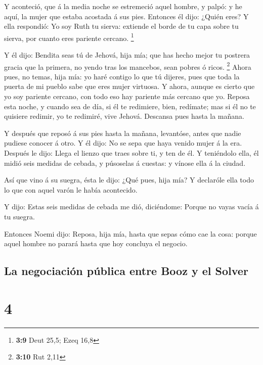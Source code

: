  Y aconteció, que á la media noche se estremeció aquel
hombre, y palpó: y he aquí, la mujer que estaba acostada á sus pies.
 Entonces él dijo: ¿Quién eres? Y ella respondió: Yo soy
Ruth tu sierva: extiende el borde de tu capa sobre tu sierva, por cuanto
eres pariente cercano. \footnote{\textbf{3:9} Deut 25,5; Ezeq 16,8}

 Y él dijo: Bendita seas tú de Jehová, hija mía; que has
hecho mejor tu postrera gracia que la primera, no yendo tras los
mancebos, sean pobres ó ricos. \footnote{\textbf{3:10} Rut 2,11}
 Ahora pues, no temas, hija mía: yo haré contigo lo que
tú dijeres, pues que toda la puerta de mi pueblo sabe que eres mujer
virtuosa.  Y ahora, aunque es cierto que yo soy pariente
cercano, con todo eso hay pariente más cercano que yo. 
Reposa esta noche, y cuando sea de día, si él te redimiere, bien,
redímate; mas si él no te quisiere redimir, yo te redimiré, vive Jehová.
Descansa pues hasta la mañana.

 Y después que reposó á sus pies hasta la mañana,
levantóse, antes que nadie pudiese conocer á otro. Y él dijo: No se sepa
que haya venido mujer á la era.  Después le dijo: Llega
el lienzo que traes sobre ti, y ten de él. Y teniéndolo ella, él midió
seis medidas de cebada, y púsoselas á cuestas: y vínose ella á la
ciudad.

 Así que vino á su suegra, ésta le dijo: ¿Qué pues, hija
mía? Y declaróle ella todo lo que con aquel varón le había acontecido.

 Y dijo: Estas seis medidas de cebada me dió, diciéndome:
Porque no vayas vacía á tu suegra.

 Entonces Noemi dijo: Reposa, hija mía, hasta que sepas
cómo cae la cosa: porque aquel hombre no parará hasta que hoy concluya
el negocio.

\hypertarget{la-negociaciuxf3n-puxfablica-entre-booz-y-el-solver}{%
\subsection{La negociación pública entre Booz y el
Solver}\label{la-negociaciuxf3n-puxfablica-entre-booz-y-el-solver}}

\hypertarget{section-3}{%
\section{4}\label{section-3}}


